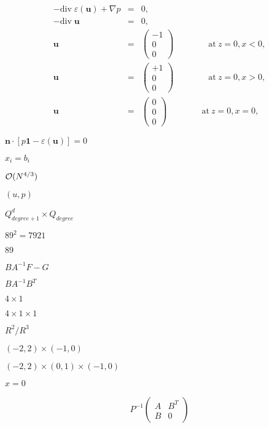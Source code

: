 \documentclass{article}
\begin{document}
\begin{eqnarray*} -\textrm{div}\; \varepsilon(\textbf{u}) + \nabla p &=& 0, \\ -\textrm{div}\; \textbf{u} &=& 0, \\ \mathbf u &=& \left(\begin{array}{c} -1 \\ 0 \\0 \end{array}\right) \qquad\qquad \textrm{at}\ z=0, x<0, \\ \mathbf u &=& \left(\begin{array}{c} +1 \\ 0 \\0 \end{array}\right) \qquad\qquad \textrm{at}\ z=0, x>0, \\ \mathbf u &=& \left(\begin{array}{c} 0 \\ 0 \\0 \end{array}\right) \qquad\qquad \textrm{at}\ z=0, x=0, \end{eqnarray*}
\pagebreak

$\textbf{n}\cdot [p \textbf{1} - \varepsilon(\textbf{u})] = 0$
\pagebreak

$x_i = b_i$
\pagebreak

${\cal O}(N^{4/3})$
\pagebreak

$(u,p)$
\pagebreak

$Q_{degree+1}^d\times Q_{degree}$
\pagebreak

$89^2=7921$
\pagebreak

$89$
\pagebreak

$B A^{-1} F - G$
\pagebreak

$B A^{-1} B^T$
\pagebreak

$4 \times 1$
\pagebreak

$4 \times 1 \times 1$
\pagebreak

$R^2/R^3$
\pagebreak

$(-2,2)\times(-1,0)$
\pagebreak

$(-2,2)\times(0,1)\times(-1,0)$
\pagebreak

$x=0$
\pagebreak

\begin{eqnarray*} P^{-1}\left(\begin{array}{cc} A & B^T \\ B & 0 \end{array}\right) \end{eqnarray*}
\pagebreak
\end{document}
